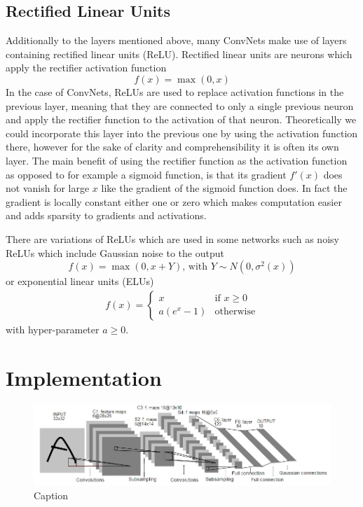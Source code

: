 \documentclass[preprint,12pt,3p]{elsarticle}
\begin{document}
\subsection{Rectified Linear Units}
Additionally to the layers mentioned above, many ConvNets make use of layers containing rectified linear units (ReLU). Rectified linear units are neurons which apply the rectifier activation function 
$$f(x)=\max(0,x)$$
In the case of ConvNets, ReLUs are used to replace activation functions in the previous layer, meaning that they are connected to only a single previous neuron and apply the rectifier function to the activation of that neuron. Theoretically we could incorporate this layer into the previous one by using the activation function there, however for the sake of clarity and comprehensibility it is often its own layer.
The main benefit of using the rectifier function as the activation function as opposed to for example a sigmoid function, is that its gradient $f'(x)$ does not vanish for large $x$ like the gradient of the sigmoid function does. In fact the gradient is locally constant either one or zero which makes computation easier and adds sparsity to gradients and activations.

There are variations of ReLUs which are used in some networks such as noisy ReLUs which include Gaussian noise to the output
$$f(x)=\max(0,x+Y) \mbox{, with }Y\sim N(0,\sigma^2(x))$$
or exponential linear units (ELUs)
\begin{align*}
    f(x)=\begin{cases}x &\mbox{if }x\geq 0\\
    a(e^x-1)&\mbox{otherwise}\end{cases}
\end{align*}
with hyper-parameter $a\geq0$.

\newpage

\section{Implementation}

\begin{figure}
    \centering
    \includegraphics[scale=0.7]{figures/lenet}
    \caption{Caption}
    \label{fig:my_label}
\end{figure}
\end{document}
